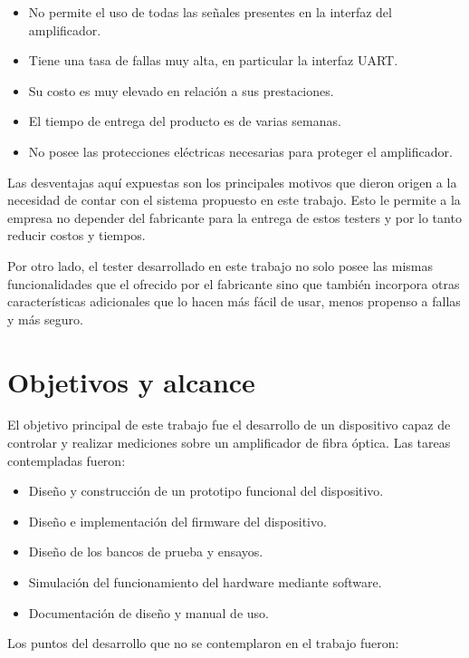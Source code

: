 \begin{itemize}
\item No permite el uso de todas las señales presentes en la interfaz del amplificador.
\item Tiene una tasa de fallas muy alta, en particular la interfaz UART.
\item Su costo es muy elevado en relación a sus prestaciones.
\item El tiempo de entrega del producto es de varias semanas.
\item No posee las protecciones eléctricas necesarias para proteger el amplificador.
\end{itemize}

Las desventajas aquí expuestas son los principales motivos que dieron origen a la necesidad de contar con el sistema propuesto en este trabajo. Esto le permite a la empresa no depender del fabricante para la entrega de estos testers y por lo tanto reducir costos y tiempos.

Por otro lado, el tester desarrollado en este trabajo no solo posee las mismas funcionalidades que el ofrecido por el fabricante sino que también incorpora otras características adicionales que lo hacen más fácil de usar, menos propenso a fallas y más seguro.


\section{Objetivos y alcance}

El objetivo principal de este trabajo fue el desarrollo de un dispositivo capaz de controlar y realizar mediciones sobre un amplificador de fibra óptica. Las tareas contempladas fueron:

\begin{itemize}
\item Diseño y construcción de un prototipo funcional del dispositivo.
\item Diseño e implementación del firmware del dispositivo.
\item Diseño de los bancos de prueba y ensayos.
\item Simulación del funcionamiento del hardware mediante software.
\item Documentación de diseño y manual de uso.
\end{itemize}

Los puntos del desarrollo que no se contemplaron en el trabajo fueron:


